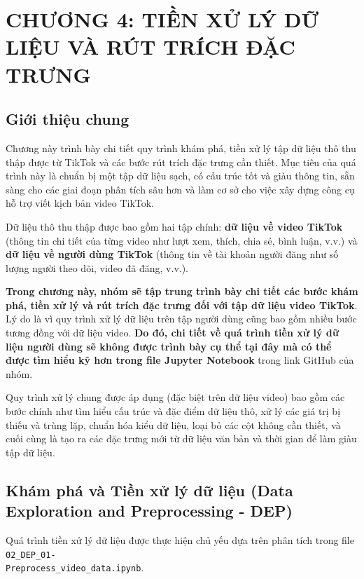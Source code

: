 \section{CHƯƠNG 4: TIỀN XỬ LÝ DỮ LIỆU VÀ RÚT TRÍCH ĐẶC TRƯNG} \label{sec:dep_fe}

\subsection{Giới thiệu chung}

Chương này trình bày chi tiết quy trình khám phá, tiền xử lý tập dữ liệu thô thu thập được từ TikTok và các bước rút trích đặc trưng cần thiết. Mục tiêu của quá trình này là chuẩn bị một tập dữ liệu sạch, có cấu trúc tốt và giàu thông tin, sẵn sàng cho các giai đoạn phân tích sâu hơn và làm cơ sở cho việc xây dựng công cụ hỗ trợ viết kịch bản video TikTok.

Dữ liệu thô thu thập được bao gồm hai tập chính: \textbf{dữ liệu về video TikTok} (thông tin chi tiết của từng video như lượt xem, thích, chia sẻ, bình luận, v.v.) và \textbf{dữ liệu về người dùng TikTok} (thông tin về tài khoản người đăng như số lượng người theo dõi, video đã đăng, v.v.).

\textbf{Trong chương này, nhóm sẽ tập trung trình bày chi tiết các bước khám phá, tiền xử lý và rút trích đặc trưng đối với tập dữ liệu video TikTok}. Lý do là vì quy trình xử lý dữ liệu trên tập người dùng cũng bao gồm nhiều bước tương đồng với dữ liệu video. \textbf{Do đó, chi tiết về quá trình tiền xử lý dữ liệu người dùng sẽ không được trình bày cụ thể tại đây mà có thể được tìm hiểu kỹ hơn trong file Jupyter Notebook} trong link GitHub của nhóm.

Quy trình xử lý chung được áp dụng (đặc biệt trên dữ liệu video) bao gồm các bước chính như tìm hiểu cấu trúc và đặc điểm dữ liệu thô, xử lý các giá trị bị thiếu và trùng lặp, chuẩn hóa kiểu dữ liệu, loại bỏ các cột không cần thiết, và cuối cùng là tạo ra các đặc trưng mới từ dữ liệu văn bản và thời gian để làm giàu tập dữ liệu.

\subsection{Khám phá và Tiền xử lý dữ liệu (Data Exploration and Preprocessing - DEP)}

Quá trình tiền xử lý dữ liệu được thực hiện chủ yếu dựa trên phân tích trong file \texttt{02\_DEP\_01-\\Preprocess\_video\_data.ipynb}.

